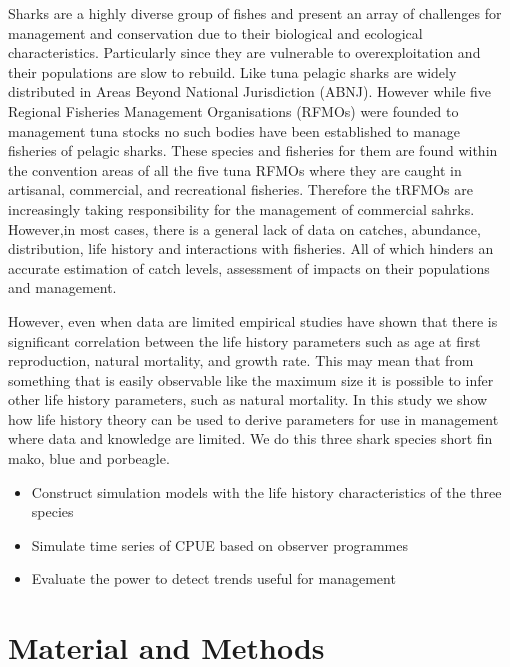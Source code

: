 \documentclass[preprint,authoryear,12pt]{elsarticle}
\begin{document}
Sharks are a highly diverse group of fishes and present an array of challenges for management and 
conservation due to their biological and ecological characteristics. Particularly since they are 
vulnerable to overexploitation and their populations are slow to rebuild. Like tuna pelagic
sharks are widely distributed in Areas Beyond National Jurisdiction (ABNJ). However while 
five Regional Fisheries Management Organisations (RFMOs) were founded to management tuna stocks no such bodies have 
been established to manage fisheries of pelagic sharks. 
These species and fisheries for them are found within the convention areas of all the five tuna RFMOs 
where they are caught in artisanal, commercial, and recreational  fisheries. Therefore the tRFMOs are increasingly
taking responsibility for the management of commercial sahrks. However,in most cases, 
there is a general lack of data on catches, abundance, distribution, life history and interactions with fisheries. 
All of which hinders an accurate estimation of catch levels, assessment of impacts on their populations and management. 

However, even when data are limited empirical studies have shown 
that there is significant correlation between the life history parameters such as age at first  reproduction, 
natural mortality, and growth rate. This may mean that from something that is easily observable like the maximum 
size it is possible to infer other life history parameters, such as natural mortality.
In this study we show how life history theory can be used to derive parameters for use in management where data and 
knowledge are limited. We do this three shark species short fin mako, blue and porbeagle. 

\begin{itemize}
 \item Construct simulation models with the life history characteristics of the three species
 \item Simulate time series of CPUE based on observer programmes
 \item Evaluate the power to detect trends useful for management
\end{itemize}

\section{Material and Methods}
\label{Methods}
\end{document}
